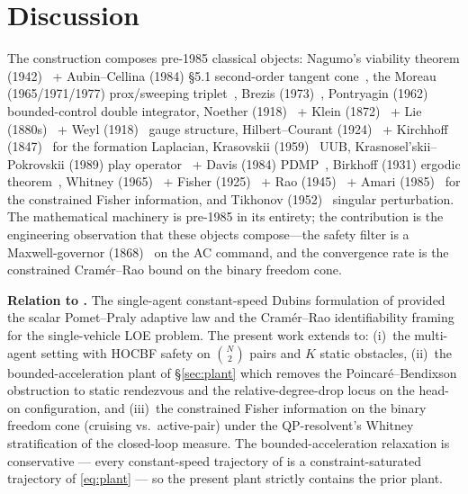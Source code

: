 \documentclass[letterpaper,10pt,conference]{IEEEtran}
\begin{document}
\section{Discussion}
The construction composes pre-1985 classical objects: Nagumo's viability theorem (1942)~\cite{nagumo1942} + Aubin--Cellina (1984) §5.1 second-order tangent cone~\cite{aubinCellina1984}, the Moreau (1965/1971/1977) prox/sweeping triplet~\cite{moreau1965,moreau1971,moreau1977}, Brezis (1973)~\cite{brezis1973}, Pontryagin (1962)~\cite{pontryagin1962} bounded-control double integrator, Noether (1918)~\cite{noether1918} + Klein (1872)~\cite{klein1872} + Lie (1880s)~\cite{lie1880s} + Weyl (1918)~\cite{weyl1918} gauge structure, Hilbert--Courant (1924)~\cite{hilbertCourant1924} + Kirchhoff (1847)~\cite{kirchhoff1847} for the formation Laplacian, Krasovskii (1959)~\cite{krasovskii1959} UUB, Krasnosel'skii--Pokrovskii (1989) play operator~\cite{krasnoselskii1989} + Davis (1984) PDMP~\cite{davis1984}, Birkhoff (1931) ergodic theorem~\cite{birkhoff1931}, Whitney (1965)~\cite{whitney1965} + Fisher (1925)~\cite{fisher1925} + Rao (1945)~\cite{rao1945} + Amari (1985)~\cite{amari1985} for the constrained Fisher information, and Tikhonov (1952)~\cite{tikhonov1952} singular perturbation. The mathematical machinery is pre-1985 in its entirety; the contribution is the engineering observation that these objects compose---the safety filter is a Maxwell-governor (1868)~\cite{maxwell1868} on the AC command, and the convergence rate is the constrained Cram\'er--Rao bound on the binary freedom cone.

\textbf{Relation to \cite{maldonadoAnnaswamy2025}.} The single-agent constant-speed Dubins formulation of \cite{maldonadoAnnaswamy2025} provided the scalar Pomet--Praly adaptive law and the Cram\'er--Rao identifiability framing for the single-vehicle LOE problem. The present work extends to: (i)~the multi-agent setting with HOCBF safety on $\binom{N}{2}$ pairs and $K$ static obstacles, (ii)~the bounded-acceleration plant of \S\ref{sec:plant} which removes the Poincar\'e--Bendixson obstruction to static rendezvous and the relative-degree-drop locus on the head-on configuration, and (iii)~the constrained Fisher information on the binary freedom cone (cruising vs.\ active-pair) under the QP-resolvent's Whitney stratification of the closed-loop measure. The bounded-acceleration relaxation is conservative — every constant-speed trajectory of \cite{maldonadoAnnaswamy2025} is a constraint-saturated trajectory of \eqref{eq:plant} — so the present plant strictly contains the prior plant.



\end{document}
